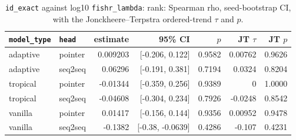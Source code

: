 \documentclass[10pt]{article}
\begin{document}
{\small
\begin{longtable}{llrrrrr}
\caption{\texttt{id\_exact} against log10 \texttt{fishr\_lambda}: rank: Spearman rho, seed-bootstrap CI, with the Jonckheere--Terpstra ordered-trend $\tau$ and $p$.}\label{tab:trend-id_exact}\\
\toprule
\texttt{model\_type} & \texttt{head} & estimate & 95\% CI & $p$ & JT $\tau$ & JT $p$\\
\midrule
\endhead
adaptive & pointer & 0.009203 & [-0.206, 0.122] & 0.9582 & 0.00762 & 0.9626\\
adaptive & seq2seq & 0.06296 & [-0.191, 0.381] & 0.7194 & 0.0324 & 0.8204\\
tropical & pointer & -0.01344 & [-0.359, 0.256] & 0.9389 & 0 & 1.0000\\
tropical & seq2seq & -0.04608 & [-0.304, 0.234] & 0.7926 & -0.0248 & 0.8542\\
vanilla & pointer & 0.01417 & [-0.156, 0.144] & 0.9356 & 0.00952 & 0.9478\\
vanilla & seq2seq & -0.1382 & [-0.38, -0.0639] & 0.4286 & -0.107 & 0.4231\\
\bottomrule
\end{longtable}
}
\end{document}

